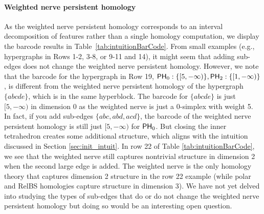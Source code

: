 \documentclass{amsart}
\newcommand{\PH}	     {\mm{\mathsf{PH}}}
\newcommand {\mm}[1]        {\ifmmode{#1}\else{\mbox{\(#1\)}}\fi}
\begin{document}
\paragraph{\textbf{Weighted nerve persistent homology}}
As the weighted nerve persistent homology corresponds to an interval decomposition of features rather than a single homology computation, we display the barcode results in Table~\ref{tab:intuitionBarCode}. From small examples (e.g., hypergraphs in Rows 1-2, 3-8, or 9-11 and 14), it might seem that adding sub-edges does not change the weighted nerve persistent homology. 
However, we note that the barcode for the hypergraph in Row 19, 
$\PH_0: \{[5,-\infty)\}, \PH_2: \{[1,-\infty)\}$, 
is different from the weighted nerve persistent homology of the hypergraph $\{abcde\}$, which is in the same hyperblock. The barcode for $\{abcde\}$ is just $[5,-\infty)$ in dimension 0 as the weighted nerve is just a 0-simplex with weight 5.
In fact, if you add sub-edges $\{abc, abd, acd\}$, the barcode of the weighted nerve persistent homology is still just $[5,-\infty)$ for $\PH_0$. But closing the inner tetrahedron creates some additional structure, which aligns with the intuition discussed in Section \ref{sec:init_intuit}.
In row 22 of Table \ref{tab:intuitionBarCode}, we see that the weighted nerve still captures nontrivial structure in dimension 2 when the second large edge is added. The weighted nerve is the only homology theory that captures dimension 2 structure in the row 22 example (while polar and RelBS homologies capture structure in dimension 3).
We have not yet delved into studying the types of sub-edges that do or do not change the weighted nerve persistent homology but doing so would be an interesting open question.
\end{document}
